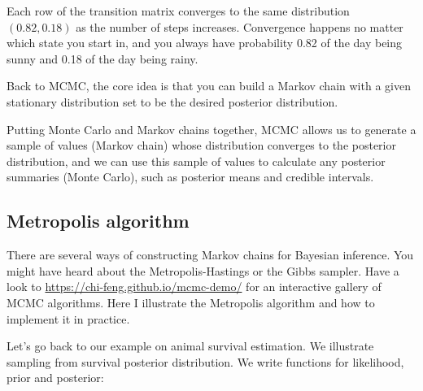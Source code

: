 \documentclass[
  12pt,
]{krantz}
\begin{document}
Each row of the transition matrix converges to the same distribution \((0.82, 0.18)\) as the number of steps increases. Convergence happens no matter which state you start in, and you always have probability 0.82 of the day being sunny and 0.18 of the day being rainy.

Back to MCMC, the core idea is that you can build a Markov chain with a given stationary distribution set to be the desired posterior distribution.

\begin{blackbox}
Putting Monte Carlo and Markov chains together, MCMC allows us to generate a sample of values (Markov chain) whose distribution converges to the posterior distribution, and we can use this sample of values to calculate any posterior summaries (Monte Carlo), such as posterior means and credible intervals.

\end{blackbox}

\subsection{Metropolis algorithm}\label{metropolis-algorithm}

There are several ways of constructing Markov chains for Bayesian inference. You might have heard about the Metropolis-Hastings or the Gibbs sampler. Have a look to \url{https://chi-feng.github.io/mcmc-demo/} for an interactive gallery of MCMC algorithms. Here I illustrate the Metropolis algorithm and how to implement it in practice.

Let's go back to our example on animal survival estimation. We illustrate sampling from survival posterior distribution. We write functions for likelihood, prior and posterior:
\end{document}
